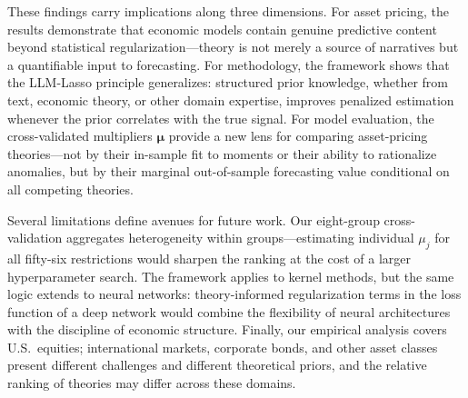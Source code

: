 These findings carry implications along three dimensions.
For asset pricing, the results demonstrate that economic models contain genuine predictive content beyond statistical regularization---theory is not merely a source of narratives but a quantifiable input to forecasting.
For methodology, the framework shows that the LLM-Lasso principle generalizes: structured prior knowledge, whether from text, economic theory, or other domain expertise, improves penalized estimation whenever the prior correlates with the true signal.
For model evaluation, the cross-validated multipliers $\bm{\mu}$ provide a new lens for comparing asset-pricing theories---not by their in-sample fit to moments or their ability to rationalize anomalies, but by their marginal out-of-sample forecasting value conditional on all competing theories.

Several limitations define avenues for future work.
Our eight-group cross-validation aggregates heterogeneity within groups---estimating individual $\mu_j$ for all fifty-six restrictions would sharpen the ranking at the cost of a larger hyperparameter search.
The framework applies to kernel methods, but the same logic extends to neural networks: theory-informed regularization terms in the loss function of a deep network would combine the flexibility of neural architectures with the discipline of economic structure.
Finally, our empirical analysis covers U.S.\ equities; international markets, corporate bonds, and other asset classes present different challenges and different theoretical priors, and the relative ranking of theories may differ across these domains.
